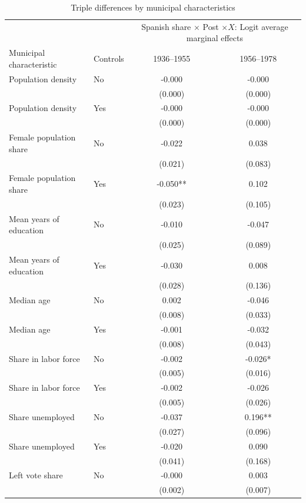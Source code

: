 \begin{table}[!htbp]
\centering
\renewcommand{\arraystretch}{1.25}
\setlength{\tabcolsep}{6pt}
\caption{Triple differences by municipal characteristics}
\label{tab:logit_triple_mfx_stata}
\small
\begin{tabular}{llcc}
\hline
 & & \multicolumn{2}{c}{Spanish share \(\times\) Post \(\times X\): Logit average marginal effects} \\
Municipal characteristic & Controls & 1936--1955 & 1956--1978 \\
\hline
Population density & No & -0.000 & -0.000 \\
 & & (0.000) & (0.000) \\
Population density & Yes & -0.000 & -0.000 \\
 & & (0.000) & (0.000) \\
\addlinespace
Female population share & No & -0.022 & 0.038 \\
 & & (0.021) & (0.083) \\
Female population share & Yes & -0.050** & 0.102 \\
 & & (0.023) & (0.105) \\
\addlinespace
Mean years of education & No & -0.010 & -0.047 \\
 & & (0.025) & (0.089) \\
Mean years of education & Yes & -0.030 & 0.008 \\
 & & (0.028) & (0.136) \\
\addlinespace
Median age & No & 0.002 & -0.046 \\
 & & (0.008) & (0.033) \\
Median age & Yes & -0.001 & -0.032 \\
 & & (0.008) & (0.043) \\
\addlinespace
Share in labor force & No & -0.002 & -0.026* \\
 & & (0.005) & (0.016) \\
Share in labor force & Yes & -0.002 & -0.026 \\
 & & (0.005) & (0.026) \\
\addlinespace
Share unemployed & No & -0.037 & 0.196** \\
 & & (0.027) & (0.096) \\
Share unemployed & Yes & -0.020 & 0.090 \\
 & & (0.041) & (0.168) \\
\addlinespace
Left vote share & No & -0.000 & 0.003 \\
 & & (0.002) & (0.007) \\

\end{tabular}
\end{table}
